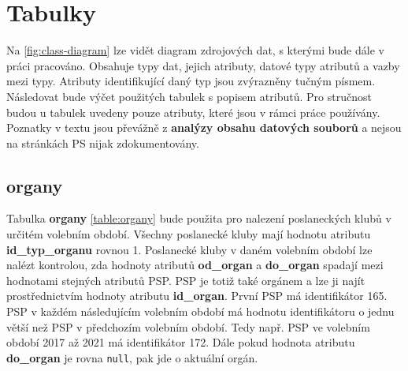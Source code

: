 \section{Tabulky}
\label{sec:db-tables}

Na \ref{fig:class-diagram} lze vidět diagram zdrojových dat, s kterými bude dále v práci pracováno. Obsahuje typy dat, jejich atributy, datové typy atributů a vazby mezi typy. Atributy identifikující daný typ jsou zvýrazněny tučným písmem. Následovat bude výčet použitých tabulek s popisem atributů. Pro stručnost budou u tabulek uvedeny pouze atributy, které jsou v rámci práce používány. Poznatky v textu jsou převážně z \textbf{analýzy obsahu datových souborů} a nejsou na stránkách PS nijak zdokumentovány.

\subsection*{organy}
Tabulka \textbf{organy} \ref{table:organy} bude použita pro nalezení poslaneckých klubů v určitém volebním období. Všechny poslanecké kluby mají hodnotu atributu \textbf{id\_typ\_organu} rovnou 1. Poslanecké kluby v daném volebním období lze nalézt kontrolou, zda hodnoty atributů \textbf{od\_organ} a \textbf{do\_organ} spadají mezi hodnotami stejných atributů PSP. PSP je totiž také orgánem a lze ji najít prostřednictvím hodnoty atributu \textbf{id\_organ}. První PSP má identifikátor 165. PSP v každém následujícím volebním období má hodnotu identifikátoru o jednu větší než PSP v předchozím volebním období. Tedy např. PSP ve volebním období 2017 až 2021 má identifikátor 172. Dále pokud hodnota atributu \textbf{do\_organ} je rovna \lstinline|null|, pak jde o aktuální orgán.

